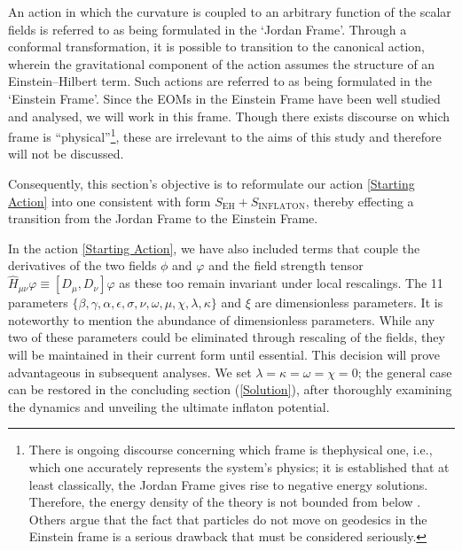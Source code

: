\documentclass[aps,prd,reprint,preprintnumbers,showpacs,floatfix,nofootinbib,superscript address]{revtex4-2}
\newcommand{\wb}[1]{{\color[RGB]{255,0,0}{\textbf{\textit{[WB: #1]}}}}}
\begin{document}
An action in which the curvature is coupled to an arbitrary function of the scalar fields is referred to as being formulated in the `Jordan Frame'. Through a conformal transformation, it is possible to transition to the canonical action, wherein the gravitational component of the action assumes the structure of an Einstein--Hilbert term. Such actions are referred to as being formulated in the `Einstein Frame'. Since the EOMs in the Einstein Frame have been well studied and analysed, we will work in this frame. Though there exists discourse on which frame is ``physical''\footnote{There is ongoing discourse concerning which frame is thephysical one, i.e., which one accurately represents the system's physics; it is established that at least classically, the Jordan Frame gives rise to negative energy solutions. Therefore, the energy density of the theory is not bounded from below \cite{faraoni_einstein_1999, faraoni_conformal_1998, magnano_physical_1994}. Others argue that the fact that particles do not move on geodesics in the Einstein frame is a serious drawback that must be considered seriously.}, these are irrelevant to the aims of this study and therefore will not be discussed.

Consequently, this section's objective is to reformulate our action \cref{Starting Action} into one consistent with form $S_{\text{EH}} + S_{\text{INFLATON}}$, thereby effecting a transition from the Jordan Frame to the Einstein Frame.

In the action \cref{Starting Action}, we have also included terms that couple the derivatives of the two fields $\phi$ and $\varphi$ and the field strength tensor $\hat{H}_{\mu\nu}\varphi \equiv [D_\mu,D_\nu]\varphi$ as these too remain invariant under local rescalings. The 11 parameters $\{\beta, \gamma, \alpha, \epsilon, \sigma, \nu, \omega, \mu, \chi ,\lambda, \kappa\}$ and $\xi$ are dimensionless parameters. It is noteworthy to mention the abundance of dimensionless parameters. While any two of these parameters could be eliminated through rescaling of the fields, they will be maintained in their current form until essential. This decision will prove advantageous in subsequent analyses. We set $\lambda = \kappa = \omega = \chi= 0$; the general case can be restored in the concluding section (\cref{Solution}), after thoroughly examining the dynamics and unveiling the ultimate inflaton potential.
\end{document}
